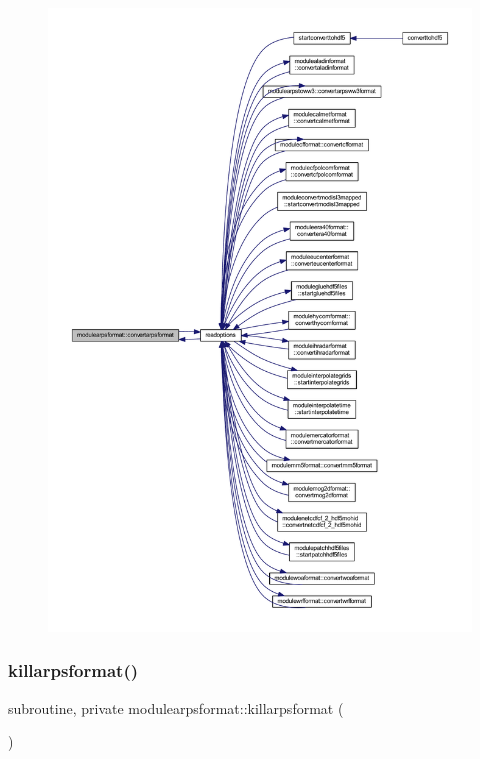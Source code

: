 \begin{figure}[H]
\begin{center}
\leavevmode
\includegraphics[width=350pt]{namespacemodulearpsformat_a996acecfde01fb49e6408da52cb50d12_icgraph}
\end{center}
\end{figure}
\mbox{\label{namespacemodulearpsformat_a3fbe9c856c732d4e5f2315c2ae61e3d3}} 
\subsubsection{\texorpdfstring{killarpsformat()}{killarpsformat()}}
{\footnotesize\ttfamily subroutine, private modulearpsformat\+::killarpsformat (\begin{DoxyParamCaption}{ }\end{DoxyParamCaption})\hspace{0.3cm}{\ttfamily [private]}}

